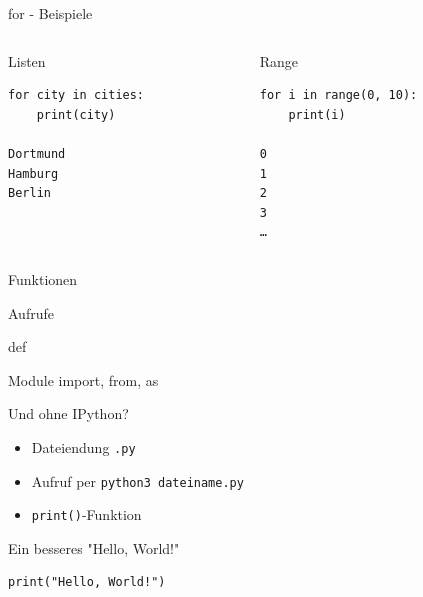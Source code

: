\begin{frame}[fragile]{for - Beispiele}
\vspace{-1em}
\begin{spacing}{1.0}
\begin{columns}
    \begin{column}{0.4\paperwidth}
      \begin{exampleblock}{Listen}
        \begin{verbatim}
for city in cities:
    print(city)
    
Dortmund
Hamburg
Berlin
        \end{verbatim}
      \end{exampleblock}
    \end{column}
    \begin{column}{.4\paperwidth}
      \begin{exampleblock}{Range}
        \begin{verbatim}
for i in range(0, 10):
    print(i)
    
0
1
2
3
…
        \end{verbatim}
      \end{exampleblock}
    \end{column}
  \end{columns}
\end{spacing}
\end{frame}

\begin{frame}{Funktionen}
  \begin{block}{Aufrufe}
  \end{block}
  \begin{block}{def}
  \end{block}
\end{frame}

\begin{frame}{Module}
  import, from, as
\end{frame}

\begin{frame}[fragile]{Und ohne IPython?}
  \begin{itemize}
    \item Dateiendung \texttt{.py}
    \item Aufruf per \texttt{python3 dateiname.py}
    \item \texttt{print()}-Funktion 
  \end{itemize}
  \begin{spacing}{1.0}
    \begin{exampleblock}{Ein besseres "Hello, World!"}
      \begin{verbatim}
print("Hello, World!")
      \end{verbatim}
    \end{exampleblock}
  \end{spacing}
\end{frame}

